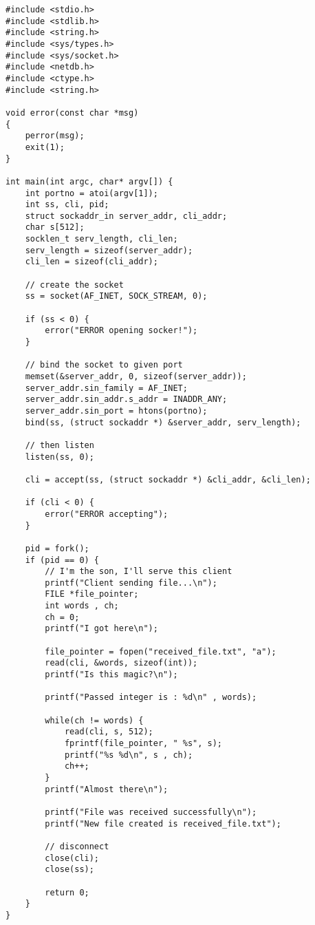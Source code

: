 \documentclass{article}
\begin{document}
\begin{lstlisting}
#include <stdio.h>
#include <stdlib.h>
#include <string.h>
#include <sys/types.h>
#include <sys/socket.h>
#include <netdb.h>
#include <ctype.h>
#include <string.h>

void error(const char *msg)
{
    perror(msg);
    exit(1);
}

int main(int argc, char* argv[]) {
    int portno = atoi(argv[1]);
    int ss, cli, pid;
    struct sockaddr_in server_addr, cli_addr;
    char s[512];
    socklen_t serv_length, cli_len;
    serv_length = sizeof(server_addr);
    cli_len = sizeof(cli_addr);

    // create the socket
    ss = socket(AF_INET, SOCK_STREAM, 0);

    if (ss < 0) {
        error("ERROR opening socker!");
    }

    // bind the socket to given port
    memset(&server_addr, 0, sizeof(server_addr));
    server_addr.sin_family = AF_INET;
    server_addr.sin_addr.s_addr = INADDR_ANY;
    server_addr.sin_port = htons(portno);
    bind(ss, (struct sockaddr *) &server_addr, serv_length);

    // then listen
    listen(ss, 0);

    cli = accept(ss, (struct sockaddr *) &cli_addr, &cli_len);

    if (cli < 0) {
        error("ERROR accepting");
    }

    pid = fork();
    if (pid == 0) {
        // I'm the son, I'll serve this client
        printf("Client sending file...\n");
        FILE *file_pointer;
        int words , ch;
        ch = 0;
        printf("I got here\n");

        file_pointer = fopen("received_file.txt", "a");
        read(cli, &words, sizeof(int));
        printf("Is this magic?\n");

        printf("Passed integer is : %d\n" , words);

        while(ch != words) {
            read(cli, s, 512);
            fprintf(file_pointer, " %s", s);
            printf("%s %d\n", s , ch);
            ch++;
        }
        printf("Almost there\n");

        printf("File was received successfully\n");
        printf("New file created is received_file.txt");
    
        // disconnect
        close(cli);
        close(ss);
        
        return 0;
    }
}
\end{lstlisting}
\end{document}
